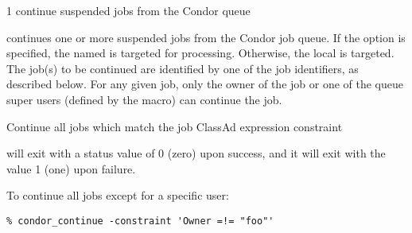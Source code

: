 \begin{ManPage}{\label{man-condor-continue}}{1}
{continue suspended jobs from the Condor queue}
\Synopsis {}
\ToolArgsBase

\ToolDebugOption
\ToolLocate
{}



\Description

 continues one or more suspended jobs from the Condor job queue.  
If the  option is specified, the named  is targeted
for processing.  
Otherwise, the local  is targeted.
The job(s) to be continued are identified by one of the job identifiers,
as described below.
For any given job, only the owner of the job or one of the queue super users
(defined by the  macro) can continue the job.

\begin{Options}
	\ToolArgsBaseDesc
	\ToolLocateDesc
    \ToolDebugDesc
	 {Continue all jobs which match
	                the job ClassAd expression constraint}
\end{Options}

\ExitStatus

 will exit with a status value of 0 (zero) upon success,
and it will exit with the value 1 (one) upon failure.

\Examples
To continue all jobs except for a specific user:
\footnotesize
\begin{verbatim}
% condor_continue -constraint 'Owner =!= "foo"'
\end{verbatim}
\normalsize

\end{ManPage}
